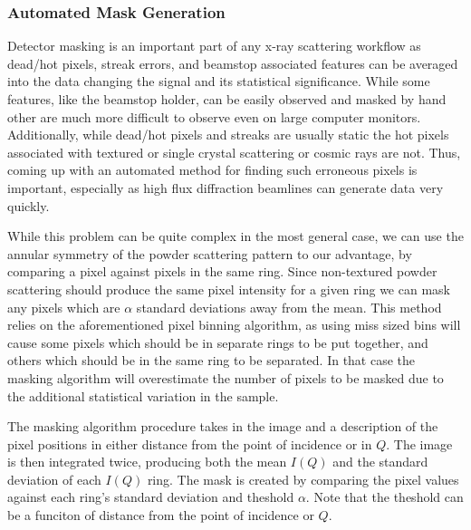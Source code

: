 \subsubsection{Automated Mask Generation}
Detector masking is an important part of any x-ray scattering workflow as dead/hot pixels, streak errors, and beamstop associated features can be averaged into the data changing the signal and its statistical significance.
While some features, like the beamstop holder, can be easily observed and masked by hand other are much more difficult to observe even on large computer monitors.
Additionally, while dead/hot pixels and streaks are usually static the hot pixels associated with textured or single crystal scattering or cosmic rays are not.
Thus, coming up with an automated method for finding such erroneous pixels is important, especially as high flux diffraction beamlines can generate data very quickly.

While this problem can be quite complex in the most general case, we can use the annular symmetry of the powder scattering pattern to our advantage, by comparing a pixel against pixels in the same ring.
Since non-textured powder scattering should produce the same pixel intensity for a given ring we can mask any pixels which are $\alpha$ standard deviations away from the mean.
This method relies on the aforementioned pixel binning algorithm, as using miss sized bins will cause some pixels which should be in separate rings to be put together, and others which should be in the same ring to be separated.
In that case the masking algorithm will overestimate the number of pixels to be masked due to the additional statistical variation in the sample.

The masking algorithm procedure takes in the image and a description of the pixel positions in either distance from the point of incidence or in $Q$.
The image is then integrated twice, producing both the mean $I(Q)$ and the standard deviation of each $I(Q)$ ring.
The mask is created by comparing the pixel values against each ring's standard deviation and theshold $\alpha$.
Note that the theshold can be a funciton of distance from the point of incidence or $Q$.


